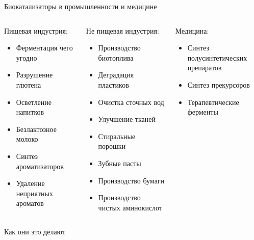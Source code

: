 \begin{frame}{Биокатализаторы в промышленности и медицине}
    \small
\begin{columns}
\begin{column}{0.3\textwidth}
    Пищевая индустрия:
    \begin{itemize}
        \item Ферментация чего угодно
        \item Разрушение глютена
        \item Осветление напитков
        \item Безлактозное молоко
        \item Синтез ароматизаторов
        \item Удаление неприятных ароматов
    \end{itemize}
    \end{column}
\begin{column}{0.3\textwidth}
    Не пищевая индустрия:
    \begin{itemize}
        \item Производство биотоплива
        \item Деградация пластиков
        \item Очистка сточных вод
        \item Улучшение тканей
        \item Стиральные порошки
        \item Зубные пасты
        \item Производство бумаги
        \item Производство чистых аминокислот
    \end{itemize}
\end{column}
\begin{column}{0.3\textwidth}
    Медицина:
    \begin{itemize}
        \item Синтез полусинтетических препаратов
        \item Синтез прекурсоров
        \item Терапевтические ферменты
        \end{itemize}
\end{column}
\end{columns}
\end{frame}





\begin{frame}{Как они это делают}
\end{frame}



